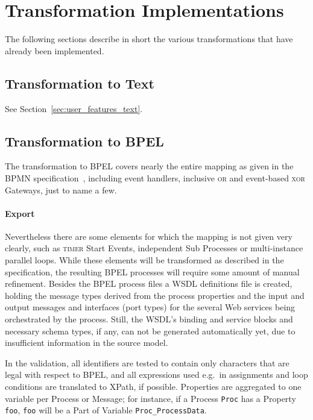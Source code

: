 
\section{Transformation Implementations}

The following sections describe in short the various transformations that have
already been implemented.


\subsection{Transformation to Text}

See Section~\ref{sec:user_features_text}.


\subsection{Transformation to BPEL}
\label{sec:user_trafo_bpel}

The transformation to BPEL covers nearly the entire mapping as given in the BPMN
specification~\cite[Appendix A]{omg2009bpmn}, including event handlers, inclusive
\textsc{or} and event-based \textsc{xor} Gateways, just to name a few.

\paragraph{Export}
Nevertheless there are some elements for which the mapping is not given very
clearly, such as \textsc{timer} Start Events, independent Sub Processes or
multi-instance parallel loops.  While these elements will be transformed as
described in the specification, the resulting BPEL processes will require some
amount of manual refinement.  Besides the BPEL process files a WSDL definitions
file is created, holding the message types derived from the process properties
and the input and output messages and interfaces (port types) for the several Web
services being orchestrated by the process.  Still, the WSDL's binding and service
blocks and necessary schema types, if any, can not be generated automatically
yet, due to insufficient information in the source model.

In the validation, all identifiers are tested to contain only characters that are
legal with respect to BPEL, and all expressions used e.g.\ in assignments and
loop conditions are translated to XPath, if possible.  Properties are aggregated
to one variable per Process or Message; for instance, if a Process \texttt{Proc}
has a Property \texttt{foo}, \texttt{foo} will be a Part of Variable
\texttt{Proc\_ProcessData}.

